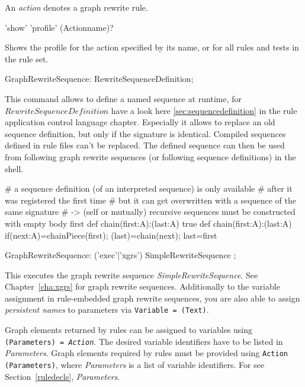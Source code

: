 An \emph{action} denotes a graph rewrite rule.

\begin{rail}
  'show' 'profile' (Actionname)?
\end{rail}
Shows the profile for the action specified by its name, or for all rules and tests in the rule set.

\begin{rail}
  GraphRewriteSequence: RewriteSequenceDefinition;
\end{rail}
This command allows to define a named sequence at runtime, for $RewriteSequenceDefinition$ have a look here  \ref{sec:sequencedefinition} in the rule application control language chapter.
Especially it allows to replace an old sequence definition, but only if the signature is identical.
Compiled sequences defined in rule files can't be replaced.
The defined sequence can then be used from following graph rewrite sequences (or following sequence definitions) in the shell.

\begin{example}
\begin{grgen}
# a sequence definition (of an interpreted sequence) is only available
# after it was registered the first time
# but it can get overwritten with a sequence of the same signature
# -> (self or mutually) recursive sequences must be constructed with empty body first
def chain(first:A):(last:A){ true }
def chain(first:A):(last:A){ if{(next:A)=chainPiece(first); (last)=chain(next); last=first} }
\end{grgen}
\end{example}

\makeatletter
\begin{rail}
  GraphRewriteSequence: ('exec'|'xgrs') SimpleRewriteSequence ;
\end{rail}
This executes the graph rewrite sequence \emph{SimpleRewriteSequence}.
See Chapter~\ref{cha:xgrs} for graph rewrite sequences.
Additionally to the variable assignment in rule-embedded graph rewrite sequences, you are also able to assign \emph{persistent names} to parameters via  \texttt{Variable = \@(Text)}.

Graph elements returned by rules can be assigned to variables using \texttt{(Para\-meters) = \emph{Action}}.
The desired variable identifiers have to be listed in \emph{Parameters}.
Graph elements required by rules must be provided using \texttt{Action (Para\-meters)}, where \emph{Parameters} is a list of variable identifiers.
For  see Section~\ref{ruledecls}, \emph{Parameters}.


